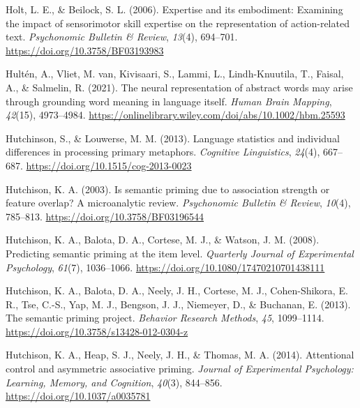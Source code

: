 \documentclass[
  12pt,
  man,floatsintext]{apa7}
\newlength{\cslhangindent}
\newlength{\cslentryspacingunit} %
\newenvironment{CSLReferences}[2] %
 {%
  \setlength{\parindent}{0pt}
  \ifodd #1
  \let\oldpar\par
  \def\par{\hangindent=\cslhangindent\oldpar}
  \fi
  \setlength{\parskip}{#2\cslentryspacingunit}
 }%
 {}
\begin{document}
\begin{CSLReferences}{1}{0}
\leavevmode{}%
Holt, L. E., \& Beilock, S. L. (2006). Expertise and its embodiment: {Examining} the impact of sensorimotor skill expertise on the representation of action-related text. \emph{Psychonomic Bulletin \& Review}, \emph{13}(4), 694--701. \url{https://doi.org/10.3758/BF03193983}

\leavevmode{}%
Hultén, A., Vliet, M. van, Kivisaari, S., Lammi, L., Lindh-Knuutila, T., Faisal, A., \& Salmelin, R. (2021). The neural representation of abstract words may arise through grounding word meaning in language itself. \emph{Human Brain Mapping}, \emph{42}(15), 4973--4984. \url{https://onlinelibrary.wiley.com/doi/abs/10.1002/hbm.25593}

\leavevmode{}%
Hutchinson, S., \& Louwerse, M. M. (2013). Language statistics and individual differences in processing primary metaphors. \emph{Cognitive Linguistics}, \emph{24}(4), 667--687. \url{https://doi.org/10.1515/cog-2013-0023}

\leavevmode{}%
Hutchison, K. A. (2003). Is semantic priming due to association strength or feature overlap? {A} microanalytic review. \emph{Psychonomic Bulletin \& Review}, \emph{10}(4), 785--813. \url{https://doi.org/10.3758/BF03196544}

\leavevmode{}%
Hutchison, K. A., Balota, D. A., Cortese, M. J., \& Watson, J. M. (2008). Predicting semantic priming at the item level. \emph{Quarterly Journal of Experimental Psychology}, \emph{61}(7), 1036--1066. \url{https://doi.org/10.1080/17470210701438111}

\leavevmode{}%
Hutchison, K. A., Balota, D. A., Neely, J. H., Cortese, M. J., Cohen-Shikora, E. R., Tse, C.-S., Yap, M. J., Bengson, J. J., Niemeyer, D., \& Buchanan, E. (2013). The semantic priming project. \emph{Behavior Research Methods}, \emph{45}, 1099--1114. \url{https://doi.org/10.3758/s13428-012-0304-z}

\leavevmode{}%
Hutchison, K. A., Heap, S. J., Neely, J. H., \& Thomas, M. A. (2014). Attentional control and asymmetric associative priming. \emph{Journal of Experimental Psychology: Learning, Memory, and Cognition}, \emph{40}(3), 844--856. \url{https://doi.org/10.1037/a0035781}


\end{CSLReferences}
\end{document}
